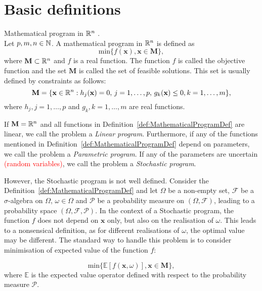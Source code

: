 \section{Basic definitions}
\begin{defn}{Mathematical program in $\mathbb{R}^n$ \cite[p. 107]{dupacovastochasticprogramming}}. \\
\label{def:MathematicalProgramDef}
Let $p,m,n \in \mathbb{N}$. A mathematical program in $\mathbb{R}^n$ is defined as
\begin{equation*}
\mathrm{min} \{f(\mathbf{x}), \mathbf{x} \in \mathbf{M}\},
\end{equation*}
where $\mathbf{M} \subset \mathbb{R}^n$ and $f$ is a real function. The function $f$ is called the objective function and the set $\mathbf{M}$ is called the set of feasible solutions. 
This set is usually defined by constraints as follows:
\begin{equation*}
	\mathbf{M} = \{\mathbf{x} \in \mathbb{R}^n: h_j(\mathbf{x})=0, \, j=1,\dots,p, \, g_k(\mathbf{x}) \leq 0, k=1,\dots,m \},
\end{equation*}
where $h_j,j=1,\dots,p$ and $g_k, k=1,\dots,m $ are real functions.
\end{defn}
If $\mathbf{M}=\mathbb{R}^n$ and all functions in Definition~\ref{def:MathematicalProgramDef} are linear, we call the problem a \textit{Linear program}.
Furthermore, if any of the functions mentioned in Definition~\ref{def:MathematicalProgramDef} depend on parameters, we call the problem a \textit{Parametric program}. If any of the parameters are uncertain \textcolor{red}{(random variables)}, we call the problem a \textit{Stochastic program}.


However, the Stochastic program is not well defined. Consider the Definition~\ref{def:MathematicalProgramDef} and let $\Omega$ be a non-empty set, $\mathcal{F}$ be a  $\sigma$-algebra on $\Omega$, $\omega \in \Omega$ and $\mathcal{P}$ be a probability measure on $(\Omega, \mathcal{F})$, leading to a probability space $(\Omega, \mathcal{F}, \mathcal{P})$. In the context of a Stochastic program, the function $f$ does not depend on $\mathbf{x}$ only, but also on the realisation of $\omega$. This leads to a nonsensical definition, as for different realisations of $\omega$, the optimal value may be different. The standard way to handle this problem is to consider minimisation of expected value of the function $f$:

\begin{equation*}
\mathrm{min} \{\mathbb{E}\left[f(\mathbf{x}, \omega)\right], \mathbf{x} \in \mathbf{M}\},
\end{equation*}
where $\mathbb{E}$ is the expected value operator defined with respect to the probability measure $\mathcal{P}$. 


